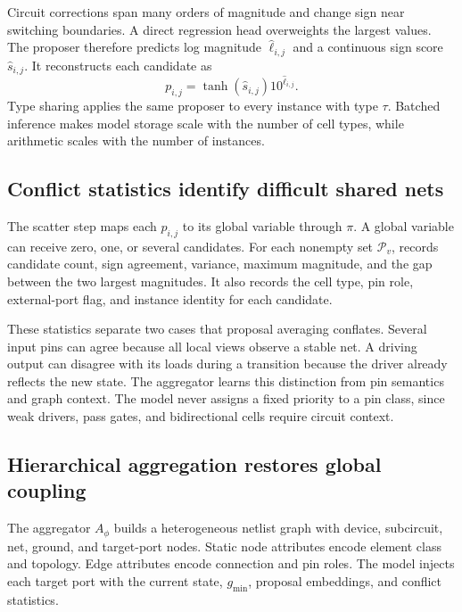 Circuit corrections span many orders of magnitude and change sign near switching boundaries. A direct regression head overweights the largest values. The proposer therefore predicts log magnitude $\widehat{\ell}_{i,j}$ and a continuous sign score $\widehat{s}_{i,j}$. It reconstructs each candidate as
\begin{equation}
p_{i,j}=\tanh(\widehat{s}_{i,j})10^{\widehat{\ell}_{i,j}}.
\label{eq:proposal}
\end{equation}
Type sharing applies the same proposer to every instance with type $\tau$. Batched inference makes model storage scale with the number of cell types, while arithmetic scales with the number of instances.

\subsection{Conflict statistics identify difficult shared nets}

The scatter step maps each $p_{i,j}$ to its global variable through $\pi$. A global variable can receive zero, one, or several candidates. For each nonempty set $\mathcal{P}_v$, \system{} records candidate count, sign agreement, variance, maximum magnitude, and the gap between the two largest magnitudes. It also records the cell type, pin role, external-port flag, and instance identity for each candidate.

These statistics separate two cases that proposal averaging conflates. Several input pins can agree because all local views observe a stable net. A driving output can disagree with its loads during a transition because the driver already reflects the new state. The aggregator learns this distinction from pin semantics and graph context. The model never assigns a fixed priority to a pin class, since weak drivers, pass gates, and bidirectional cells require circuit context.

\subsection{Hierarchical aggregation restores global coupling}

The aggregator $A_\phi$ builds a heterogeneous netlist graph with device, subcircuit, net, ground, and target-port nodes. Static node attributes encode element class and topology. Edge attributes encode connection and pin roles. The model injects each target port with the current state, $g_{\min}$, proposal embeddings, and conflict statistics.


